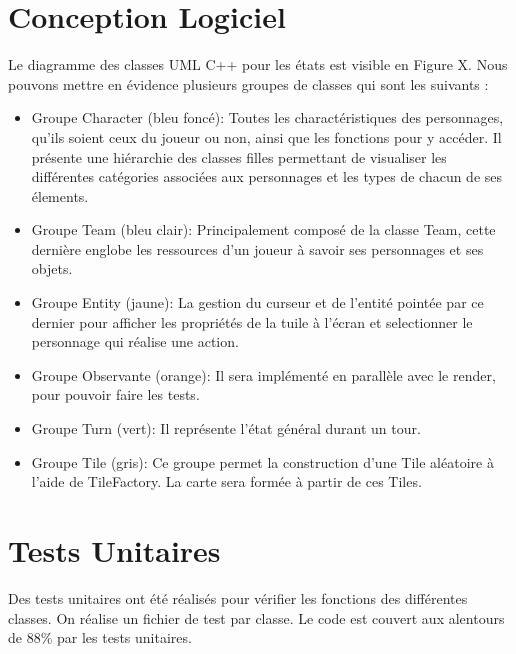 \section{Conception Logiciel}
Le diagramme des classes UML C++ pour les états est visible en Figure X. Nous pouvons mettre en évidence plusieurs groupes de classes qui sont les suivants :
\\
\begin{itemize}
    \item Groupe Character (bleu foncé): Toutes les charactéristiques des personnages, qu'ils soient ceux du joueur ou non, ainsi que les fonctions pour y accéder. Il présente une hiérarchie des classes filles permettant de visualiser les différentes catégories associées aux personnages et les types de chacun de ses élements.
    \\
    \item Groupe Team (bleu clair): Principalement composé de la classe Team, cette dernière englobe les ressources d'un joueur à savoir ses personnages et ses objets.
    \\
    \item Groupe Entity (jaune): La gestion du curseur et de l'entité pointée par ce dernier pour afficher les propriétés de la tuile à l'écran et selectionner le personnage qui réalise une action. 
    \\
    \item Groupe Observante (orange): Il sera implémenté en parallèle avec le render, pour pouvoir faire les tests.
    \\
    \item Groupe Turn (vert): Il représente l'état général durant un tour.
    \\
    \item Groupe Tile (gris): Ce groupe permet la construction d'une Tile aléatoire à l'aide de TileFactory. La carte sera formée à partir de ces Tiles. 
\end{itemize}

\section{Tests Unitaires}

Des tests unitaires ont été réalisés pour vérifier les fonctions des différentes classes. On réalise un fichier de test par classe.
Le code est couvert aux alentours de 88\% par les tests unitaires.
